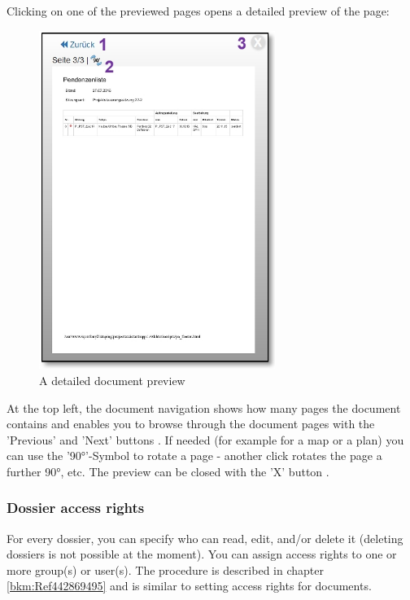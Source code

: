 \pagebreak

Clicking on one of the previewed pages opens a detailed preview of the page:

\vspace{\baselineskip}

\begin{figure}   %
  \vspace{-30pt}      %
  \begin{center}
    \includegraphics[height=110mm]{../chapters/11_Dokumentenablage/pictures/11-1-2_VorschauDetails.jpg}
  \end{center}
  \vspace{-20pt}
  \caption{A detailed document preview}
  \vspace{-10pt}
\end{figure}
At the top left, the document navigation shows how many pages the document contains and enables you to browse through the document pages with the 'Previous' and 'Next' buttons . If needed (for example for a map or a plan) you can use the '90°'-Symbol to rotate a page - another click rotates the page a further 90°, etc. The preview can be closed with the 'X' button .

\vspace{5cm}

\subsubsection{Dossier access rights}
\label{bkm:Ref442273510}
For every dossier, you can specify who can read, edit, and/or delete it (deleting dossiers is not possible at the moment). You can assign access rights to one or more group(s) or user(s). The procedure is described in chapter \ref{bkm:Ref442869495} and is similar to setting access rights for documents.

